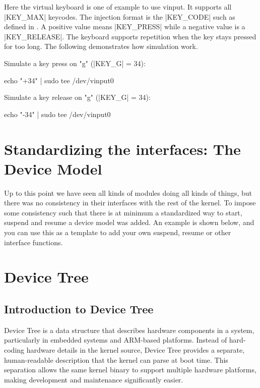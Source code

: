 \documentclass[10pt, oneside]{book}
\begin{document}

Here the virtual keyboard is one of example to use vinput.
It supports all \cpp|KEY_MAX| keycodes.
The injection format is the \cpp|KEY_CODE| such as defined in .
A positive value means \cpp|KEY_PRESS| while a negative value is a \cpp|KEY_RELEASE|.
The keyboard supports repetition when the key stays pressed for too long.
The following demonstrates how simulation work.

Simulate a key press on "g" (\cpp|KEY_G| = 34):

\begin{codebash}
echo "+34" | sudo tee /dev/vinput0
\end{codebash}

Simulate a key release on "g" (\cpp|KEY_G| = 34):

\begin{codebash}
echo "-34" | sudo tee /dev/vinput0
\end{codebash}



\section{Standardizing the interfaces: The Device Model}
\label{sec:device_model}
Up to this point we have seen all kinds of modules doing all kinds of things, but there was no consistency in their interfaces with the rest of the kernel.
To impose some consistency such that there is at minimum a standardized way to start, suspend and resume a device model was added.
An example is shown below, and you can use this as a template to add your own suspend, resume or other interface functions.


\section{Device Tree}
\label{sec:device_tree}
\subsection{Introduction to Device Tree}
\label{sec:dt_intro}
Device Tree is a data structure that describes hardware components in a system, particularly in embedded systems and ARM-based platforms.
Instead of hard-coding hardware details in the kernel source, Device Tree provides a separate, human-readable description that the kernel can parse at boot time.
This separation allows the same kernel binary to support multiple hardware platforms,
making development and maintenance significantly easier.
\end{document}
